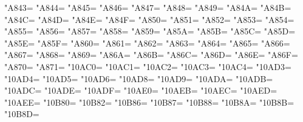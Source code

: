 \XeTeXcharclass"A843=\KclassArabD
\XeTeXcharclass"A844=\KclassArabD
\XeTeXcharclass"A845=\KclassArabD
\XeTeXcharclass"A846=\KclassArabD
\XeTeXcharclass"A847=\KclassArabD
\XeTeXcharclass"A848=\KclassArabD
\XeTeXcharclass"A849=\KclassArabD
\XeTeXcharclass"A84A=\KclassArabD
\XeTeXcharclass"A84B=\KclassArabD
\XeTeXcharclass"A84C=\KclassArabD
\XeTeXcharclass"A84D=\KclassArabD
\XeTeXcharclass"A84E=\KclassArabD
\XeTeXcharclass"A84F=\KclassArabD
\XeTeXcharclass"A850=\KclassArabD
\XeTeXcharclass"A851=\KclassArabD
\XeTeXcharclass"A852=\KclassArabD
\XeTeXcharclass"A853=\KclassArabD
\XeTeXcharclass"A854=\KclassArabD
\XeTeXcharclass"A855=\KclassArabD
\XeTeXcharclass"A856=\KclassArabD
\XeTeXcharclass"A857=\KclassArabD
\XeTeXcharclass"A858=\KclassArabD
\XeTeXcharclass"A859=\KclassArabD
\XeTeXcharclass"A85A=\KclassArabD
\XeTeXcharclass"A85B=\KclassArabD
\XeTeXcharclass"A85C=\KclassArabD
\XeTeXcharclass"A85D=\KclassArabD
\XeTeXcharclass"A85E=\KclassArabD
\XeTeXcharclass"A85F=\KclassArabD
\XeTeXcharclass"A860=\KclassArabD
\XeTeXcharclass"A861=\KclassArabD
\XeTeXcharclass"A862=\KclassArabD
\XeTeXcharclass"A863=\KclassArabD
\XeTeXcharclass"A864=\KclassArabD
\XeTeXcharclass"A865=\KclassArabD
\XeTeXcharclass"A866=\KclassArabD
\XeTeXcharclass"A867=\KclassArabD
\XeTeXcharclass"A868=\KclassArabD
\XeTeXcharclass"A869=\KclassArabD
\XeTeXcharclass"A86A=\KclassArabD
\XeTeXcharclass"A86B=\KclassArabD
\XeTeXcharclass"A86C=\KclassArabD
\XeTeXcharclass"A86D=\KclassArabD
\XeTeXcharclass"A86E=\KclassArabD
\XeTeXcharclass"A86F=\KclassArabD
\XeTeXcharclass"A870=\KclassArabD
\XeTeXcharclass"A871=\KclassArabD
\XeTeXcharclass"10AC0=\KclassArabD
\XeTeXcharclass"10AC1=\KclassArabD
\XeTeXcharclass"10AC2=\KclassArabD
\XeTeXcharclass"10AC3=\KclassArabD
\XeTeXcharclass"10AC4=\KclassArabD
\XeTeXcharclass"10AD3=\KclassArabD
\XeTeXcharclass"10AD4=\KclassArabD
\XeTeXcharclass"10AD5=\KclassArabD
\XeTeXcharclass"10AD6=\KclassArabD
\XeTeXcharclass"10AD8=\KclassArabD
\XeTeXcharclass"10AD9=\KclassArabD
\XeTeXcharclass"10ADA=\KclassArabD
\XeTeXcharclass"10ADB=\KclassArabD
\XeTeXcharclass"10ADC=\KclassArabD
\XeTeXcharclass"10ADE=\KclassArabD
\XeTeXcharclass"10ADF=\KclassArabD
\XeTeXcharclass"10AE0=\KclassArabD
\XeTeXcharclass"10AEB=\KclassArabD
\XeTeXcharclass"10AEC=\KclassArabD
\XeTeXcharclass"10AED=\KclassArabD
\XeTeXcharclass"10AEE=\KclassArabD
\XeTeXcharclass"10B80=\KclassArabD
\XeTeXcharclass"10B82=\KclassArabD
\XeTeXcharclass"10B86=\KclassArabD
\XeTeXcharclass"10B87=\KclassArabD
\XeTeXcharclass"10B88=\KclassArabD
\XeTeXcharclass"10B8A=\KclassArabD
\XeTeXcharclass"10B8B=\KclassArabD
\XeTeXcharclass"10B8D=\KclassArabD
